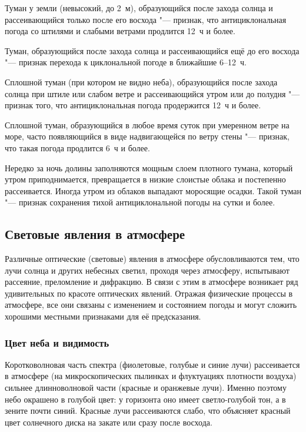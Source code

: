  Туман у земли (невысокий, до 2~м), образующийся после захода
солнца и рассеивающийся только после его восхода "--- признак, что
антициклональная погода со штилями и слабыми ветрами продлится 12~ч и
более.

 Туман, образующийся после захода солнца и рассеивающийся ещё
до его восхода "--- признак перехода к циклональной погоде в ближайшие
6--12~ч.

 Сплошной туман (при котором не видно неба), образующийся после
захода солнца при штиле или слабом ветре и рассеивающийся утром или до
полудня "--- признак того, что антициклональная погода продержится 12~ч и
более.

 Сплошной туман, образующийся в любое время суток при умеренном
ветре на море, часто появляющийся в виде надвигающейся по ветру стены
"--- признак, что такая погода продлится 6~ч и более.

 Нередко за ночь долины заполняются мощным слоем плотного
тумана, который утром приподнимается, превращается в низкие слоистые
облака и постепенно рассеивается. Иногда утром из облаков выпадают
моросящие осадки. Такой туман "--- признак сохранения тихой
антициклональной погоды на сутки и более.

\subsection{Световые явления в атмосфере}

Различные оптические (световые) явления в атмосфере обусловливаются
тем, что лучи солнца и других небесных светил, проходя через
атмосферу, испытывают рассеяние, преломление и дифракцию. В связи с
этим в атмосфере возникает ряд удивительных по красоте оптических
явлений. Отражая физические процессы в атмосфере, все они связаны с
изменением и состоянием погоды и могут сложить хорошими местными
признаками для её предсказания.

\subsubsection{Цвет неба и видимость}

Коротковолновая часть спектра (фиолетовые, голубые и синие лучи)
рассеивается в атмосфере (на микроскопических пылинках и флуктуациях
плотности воздуха) сильнее длинноволновой части (красные и оранжевые
лучи). Именно поэтому небо окрашено в голубой цвет: у горизонта оно
имеет светло-голубой тон, а в зените почти синий. Красные лучи
рассеиваются слабо, что объясняет красный цвет солнечного диска на
закате или сразу после восхода.

